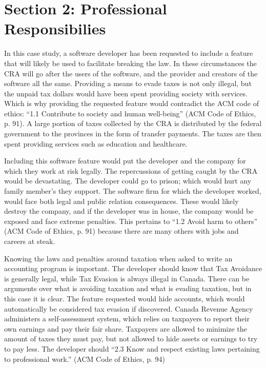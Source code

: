 \section{Section 2: Professional Responsibilies}

In this case study, a software developer has been requested to include a feature that will likely be used to facilitate breaking the law. In these circumstances the CRA will go after the users of the software, and the provider and creators of the software all the same. Providing a means to evade taxes is not only illegal, but the unpaid tax dollars would have been spent providing society with services. Which is why providing the requested feature would contradict the ACM code of ethics: ``1.1 Contribute to society and human well-being'' (ACM Code of Ethics, p. 91). A large portion of taxes collected by the CRA is distributed by the federal government to the provinces in the form of transfer payments. The taxes are then spent providing services such as education and healthcare. 

Including this software feature would put the developer and the company for which they work at risk legally. The repercussions of getting caught by the CRA would be devastating. The developer could go to prison; which would hurt any family member's they support. The software firm for which the developer worked, would face both legal and public relation consequences. These would likely destroy the company, and if the developer was in house, the company would be exposed and face extreme penalties. This pertains to ``1.2 Avoid harm to others'' (ACM Code of Ethics, p. 91) because there are many others with jobs and careers at steak.

Knowing the laws and penalties around taxation when asked to write an accounting program is important. The developer should know that Tax Avoidance is generally legal, while Tax Evasion is always illegal in Canada. There can be arguments over what is avoiding taxation and what is evading taxation, but in this case it is clear. The feature requested would hide accounts, which would automatically be considered tax evasion if discovered. Canada Revenue Agency administers a self-assessment system, which relies on taxpayers to report their own earnings and pay their fair share. Taxpayers are allowed to minimize the amount of taxes they must pay, but not allowed to hide assets or earnings to try to pay less. The developer should ``2.3 Know and respect existing laws pertaining to professional work.'' (ACM Code of Ethics, p. 94)  
